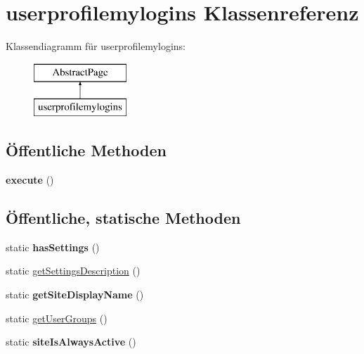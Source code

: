 \hypertarget{classuserprofilemylogins}{}\section{userprofilemylogins Klassenreferenz}
\label{classuserprofilemylogins}
Klassendiagramm für userprofilemylogins\+:\begin{figure}[H]
\begin{center}
\leavevmode
\includegraphics[height=2.000000cm]{classuserprofilemylogins}
\end{center}
\end{figure}
\subsection*{Öffentliche Methoden}
\begin{DoxyCompactItemize}
\item 
\mbox{\label{classuserprofilemylogins_ab558a81217bdddfb599ca747e79fd93e}} 
{\bfseries execute} ()
\end{DoxyCompactItemize}
\subsection*{Öffentliche, statische Methoden}
\begin{DoxyCompactItemize}
\item 
\mbox{\label{classuserprofilemylogins_aa9d6c781b084cc56b7acf8402de2b656}} 
static {\bfseries has\+Settings} ()
\item 
static \mbox{\hyperlink{classuserprofilemylogins_acf5efa57bb9e85e2254bdf9abf7f0317}{get\+Settings\+Description}} ()
\item 
\mbox{\label{classuserprofilemylogins_a12d59b98bb534ad59a00e91b8c93cdf5}} 
static {\bfseries get\+Site\+Display\+Name} ()
\item 
static \mbox{\hyperlink{classuserprofilemylogins_a9bcef2f2cb8485edda7878b59aa4962c}{get\+User\+Groups}} ()
\item 
\mbox{\label{classuserprofilemylogins_aa74eea639170e941ef0a17af1873eb5f}} 
static {\bfseries site\+Is\+Always\+Active} ()
\end{DoxyCompactItemize}
